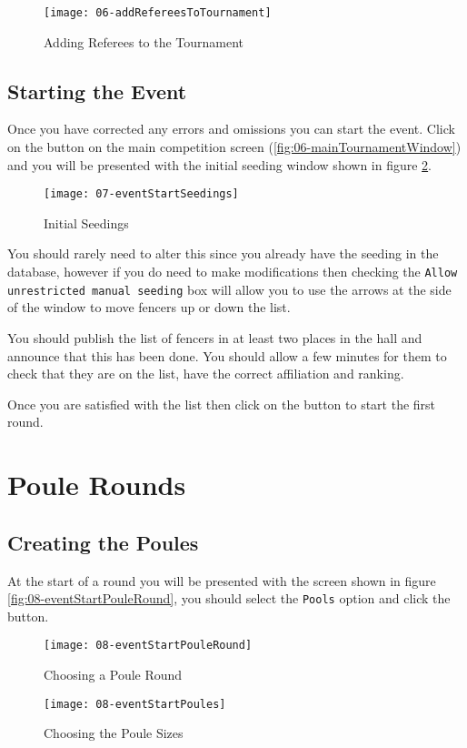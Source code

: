 \documentclass[a4paper,11pt]{memoir}
\begin{document}
\begin{figure}[!ht]
 \centering
 \texttt{[image: 06-addRefereesToTournament]}
 \caption{Adding Referees to the Tournament} \label{fig:06-addRefereesToTournament}
\end{figure}

\section{Starting the Event}
Once you have corrected any errors and omissions you can start the event. Click on the  button on the main competition screen (\ref{fig:06-mainTournamentWindow}) and you will be presented with the initial seeding window shown in figure \ref{fig:07-eventStartSeedings}.

\begin{figure}[!ht]
 \centering
 \texttt{[image: 07-eventStartSeedings]}
 \caption{Initial Seedings} \label{fig:07-eventStartSeedings}
\end{figure}

You should rarely need to alter this since you already have the seeding in the database, however if you do need to make modifications then checking the \texttt{Allow unrestricted manual seeding} box will allow you to use the arrows at the side of the window to move fencers up or down the list.

You should publish the list of fencers in at least two places in the hall and announce that this has been done. You should allow a few minutes for them to check that they are on the list, have the correct affiliation and ranking.

Once you are satisfied with the list then click on the  button to start the first round.

\chapter{Poule Rounds}

\section{Creating the Poules}

At the start of a round you will be presented with the screen shown in figure \ref{fig:08-eventStartPouleRound}, you should select the \texttt{Pools} option and click the  button. 

\begin{figure}[!ht]
 \centering
 \begin{minipage}{0.4\textwidth}
  \centering
  \texttt{[image: 08-eventStartPouleRound]}
  \caption{Choosing a Poule Round} \label{fig:08-eventStartPouleRound}
 \end{minipage}
 \hfill
 \begin{minipage}{0.4\textwidth}
   \centering
   \texttt{[image: 08-eventStartPoules]}
  \caption{Choosing the Poule Sizes} \label{fig:08-eventStartPoules}
 \end{minipage}
\end{figure}
\end{document}
